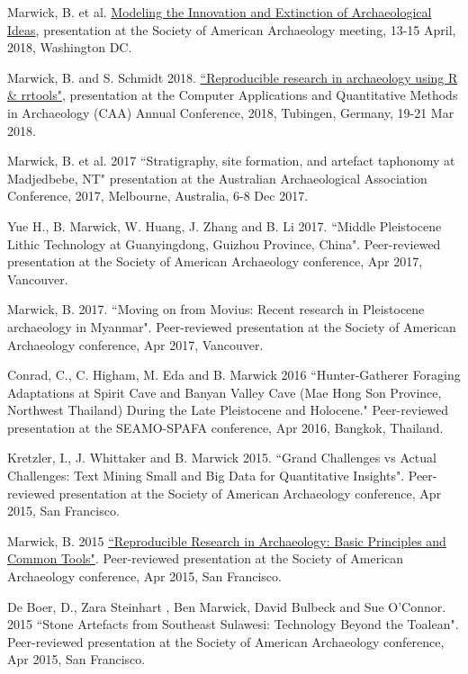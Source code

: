 \ind Marwick, B. et al. {\href{https://osf.io/tz6s5/}{Modeling the Innovation and Extinction of Archaeological Ideas}}, presentation at the Society of American Archaeology meeting, 13-15 April, 2018, Washington DC.

\ind Marwick, B. and S. Schmidt 2018.  {\href{https://github.com/benmarwick/caa2018-Tubingen}{``Reproducible research in archaeology using R \& rrtools"}}, presentation at the Computer Applications and Quantitative Methods in Archaeology (CAA) Annual Conference, 2018, Tubingen, Germany, 19-21 Mar 2018.

\ind  Marwick, B. et al. 2017 ``Stratigraphy, site formation, and artefact taphonomy at Madjedbebe, NT" presentation at the Australian Archaeological Association Conference, 2017, Melbourne, Australia, 6-8 Dec 2017.

\ind  Yue H., B. Marwick, W. Huang, J. Zhang and B. Li  2017. ``Middle Pleistocene Lithic Technology at Guanyingdong, Guizhou Province, China".  Peer-reviewed presentation at the Society of American Archaeology conference, Apr 2017, Vancouver.

\ind  Marwick, B. 2017. ``Moving on from Movius: Recent research in Pleistocene archaeology in Myanmar".  Peer-reviewed presentation at the Society of American Archaeology conference, Apr 2017, Vancouver.

\ind Conrad, C., C. Higham, M. Eda and B. Marwick 2016 ``Hunter-Gatherer Foraging Adaptations at Spirit Cave and Banyan Valley Cave (Mae Hong Son Province, Northwest Thailand) During the Late Pleistocene and Holocene." Peer-reviewed presentation at the SEAMO-SPAFA conference, Apr 2016, Bangkok, Thailand.

\ind Kretzler, I., J. Whittaker and B. Marwick 2015. ``Grand Challenges vs Actual Challenges: Text Mining Small and Big Data for Quantitative Insights".  Peer-reviewed presentation at the Society of American Archaeology conference, Apr 2015, San Francisco.

\ind Marwick, B. 2015 {\href{https://github.com/benmarwick/SAA2015-Open-Methods}{``Reproducible Research in Archaeology: Basic Principles and Common Tools"}}. Peer-reviewed presentation at the Society of American Archaeology conference, Apr 2015, San Francisco.

\ind De Boer, D., Zara Steinhart , Ben Marwick, David Bulbeck and Sue O'Connor. 2015 ``Stone Artefacts from Southeast Sulawesi: Technology Beyond the Toalean". Peer-reviewed presentation at the Society of American Archaeology conference, Apr 2015, San Francisco.

